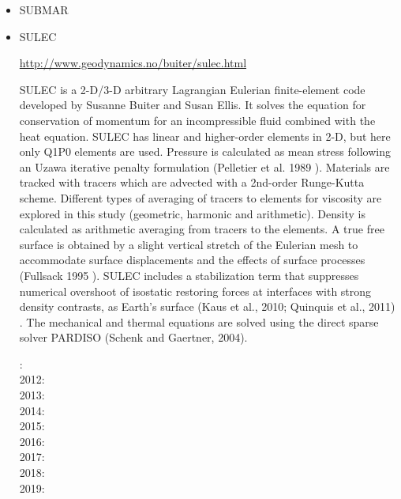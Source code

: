 \begin{itemize}
\item {\codefont SUBMAR} 

{\small
\noindent
\cite{masr06}
\cite{masp07}
\cite{roms10}
}

\item {\codefont SULEC} 

\url{http://www.geodynamics.no/buiter/sulec.html}

SULEC is a 2-D/3-D arbitrary Lagrangian Eulerian finite-element code developed by Susanne Buiter and Susan Ellis. It solves the equation for conservation of momentum for an incompressible fluid combined with the heat equation. SULEC has linear and higher-order elements in 2-D, but here only Q1P0 elements are used. Pressure is calculated as mean stress following an Uzawa iterative penalty formulation (Pelletier et al. 1989 \cite{pefc89}). Materials are tracked with tracers which are advected with a 2nd-order Runge-Kutta scheme. Different types of averaging of tracers to elements for viscosity are explored in this study (geometric, harmonic and arithmetic). Density is calculated as arithmetic averaging from tracers to the elements. A true free surface is obtained by a slight vertical stretch of the Eulerian mesh to accommodate surface displacements and the effects of surface processes (Fullsack 1995 \cite{full95}). SULEC includes a stabilization term that suppresses numerical overshoot of isostatic restoring forces at interfaces with strong density contrasts, as Earth's surface (Kaus et al., 2010; Quinquis et al., 2011) \cite{kamm10,qube11}. The mechanical and thermal equations are solved using the direct sparse solver PARDISO (Schenk and Gaertner, 2004). \cite{scga04}

{\small
{}: \cite{qube11}\cite{ellw11}\\
2012: \cite{buit12}\cite{tebu12}\cite{crsg12}\cite{grel12}\\
2013: \cite{ghbu13}\\
2014: \cite{ghbu14}\cite{qubu14}\\
2015: \cite{nabu15}\\
2016: \cite{zwsn16}\\
2017: \cite{nabp17}\\
2018: \cite{tebu18}\\
2019: \cite{elgb19}
}


\end{itemize}
